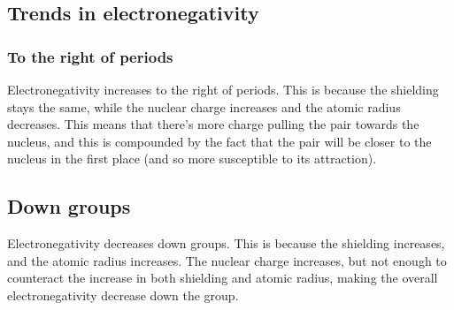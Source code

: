 \subsection{Trends in electronegativity}
\subsubsection{To the right of periods}
Electronegativity increases to the right of periods. This is because the shielding stays the same, while the nuclear charge increases and the atomic radius decreases. This means that there's more charge pulling the pair towards the nucleus, and this is compounded by the fact that the pair will be closer to the nucleus in the first place (and so more susceptible to its attraction).
\subsection{Down groups}
Electronegativity decreases down groups. This is because the shielding increases, and the atomic radius increases. The nuclear charge increases, but not enough to counteract the increase in both shielding and atomic radius, making the overall electronegativity decrease down the group.

